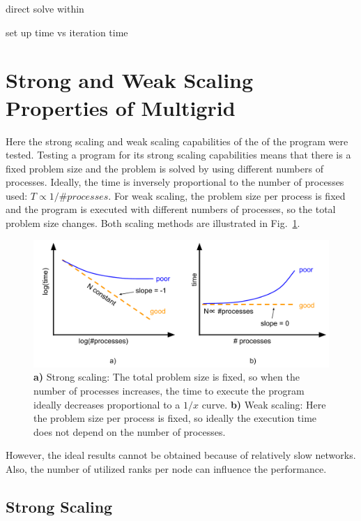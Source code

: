 direct solve within

set up time vs iteration time

\section{Strong and Weak Scaling Properties of Multigrid}

Here the strong scaling and weak scaling capabilities of the of the program were tested. Testing a program for its strong scaling capabilities means that there is a fixed problem size and the problem is solved by using different numbers of processes. Ideally, the time is inversely proportional to the number of processes used: $T \propto 1/\textit{\#processes}$. For weak scaling, the problem size per process is fixed and the program is executed with different numbers of processes, so the total problem size changes. Both scaling methods are illustrated in Fig.~\ref{fig:strong_weak_scaling}.


\begin{figure}[tb]
	\centering
\hspace*{-7mm}	\includegraphics[width=1.\textwidth]{4_strong_weak_scaling}
	\caption{\textbf{a)} Strong scaling: The total problem size is fixed, so when the number of processes increases, the time to execute the program ideally decreases proportional to a $1/x$ curve. \textbf{b)} Weak scaling: Here the problem size per process is fixed, so ideally the execution time does not depend on the number of processes.}
	\label{fig:strong_weak_scaling}
\end{figure}

However, the ideal results cannot be obtained because of relatively slow networks. Also, the number of utilized ranks per node can influence the performance.

\subsection{Strong Scaling}


